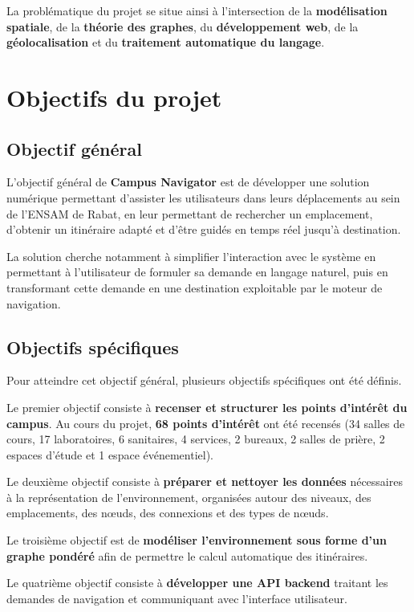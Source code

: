 \documentclass[12pt,a4paper]{report}
\begin{document}
La problématique du projet se situe ainsi à l'intersection de la \textbf{modélisation spatiale},
de la \textbf{théorie des graphes}, du \textbf{développement web}, de la
\textbf{géolocalisation} et du \textbf{traitement automatique du langage}.

\section{Objectifs du projet}

\subsection{Objectif général}

L'objectif général de \textbf{Campus Navigator} est de développer une solution numérique
permettant d'assister les utilisateurs dans leurs déplacements au sein de l'ENSAM de Rabat, en
leur permettant de rechercher un emplacement, d'obtenir un itinéraire adapté et d'être guidés en
temps réel jusqu'à destination.

La solution cherche notamment à simplifier l'interaction avec le système en permettant à
l'utilisateur de formuler sa demande en langage naturel, puis en transformant cette demande en
une destination exploitable par le moteur de navigation.

\subsection{Objectifs spécifiques}

Pour atteindre cet objectif général, plusieurs objectifs spécifiques ont été définis.

Le premier objectif consiste à \textbf{recenser et structurer les points d'intérêt du campus}.
Au cours du projet, \textbf{68 points d'intérêt} ont été recensés (34 salles de cours,
17 laboratoires, 6 sanitaires, 4 services, 2 bureaux, 2 salles de prière, 2 espaces d'étude et
1 espace événementiel).

Le deuxième objectif consiste à \textbf{préparer et nettoyer les données} nécessaires à la
représentation de l'environnement, organisées autour des niveaux, des emplacements, des nœuds,
des connexions et des types de nœuds.

Le troisième objectif est de \textbf{modéliser l'environnement sous forme d'un graphe pondéré}
afin de permettre le calcul automatique des itinéraires.

Le quatrième objectif consiste à \textbf{développer une API backend} traitant les demandes de
navigation et communiquant avec l'interface utilisateur.
\end{document}
